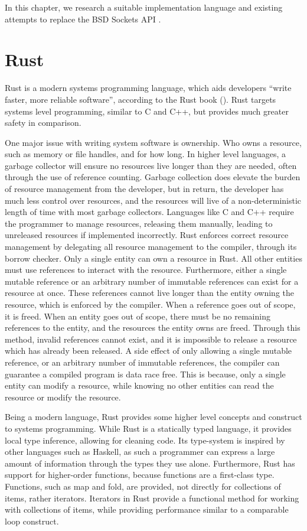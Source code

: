 In this chapter, we research a suitable implementation language and existing attempts to replace the BSD Sockets API .

\section{Rust}\label{sec:rust}
Rust is a modern systems programming language, which aids developers “write faster, more reliable software”, according
to the Rust book (\cite{kalbnik_rustprogramminglanguage_}).
Rust targets systems level programming, similar to C and C++, but provides much greater safety in comparison.

One major issue with writing system software is ownership.
Who owns a resource, such as memory or file handles, and for how long.
In higher level languages, a garbage collector will ensure no resources live longer than they are needed, often through
the use of reference counting.
Garbage collection does elevate the burden of resource management from the developer, but in return, the developer has
much less control over resources, and the resources will live of a non-deterministic length of time with most garbage
collectors.
Languages like C and C++ require the programmer to manage resources, releasing them manually, leading to unreleased
resources if implemented incorrectly.
Rust enforces correct resource management by delegating all resource management to the compiler, through its borrow
checker.
Only a single entity can own a resource in Rust.
All other entities must use references to interact with the resource.
Furthermore, either a single mutable reference or an arbitrary number of immutable references can exist for a resource
at once.
These references cannot live longer than the entity owning the resource, which is enforced by the compiler.
When a reference goes out of scope, it is freed.
When an entity goes out of scope, there must be no remaining references to the entity, and the resources the entity owns
are freed.
Through this method, invalid references cannot exist, and it is impossible to release a resource which has already been
released.
A side effect of only allowing a single mutable reference, or an arbitrary number of immutable references, the compiler
can guarantee a compiled program is data race free.
This is because, only a single entity can modify a resource, while knowing no other entities can read the resource or
modify the resource.

Being a modern language, Rust provides some higher level concepts and construct to systems programming.
While Rust is a statically typed language, it provides local type inference, allowing for cleaning code.
Its type-system is inspired by other languages such as Haskell, as such a programmer can express a large amount of
information through the types they use alone.
Furthermore, Rust has support for higher-order functions, because functions are a first-class type.
Functions, such as map and fold, are provided, not directly for collections of items, rather iterators.
Iterators in Rust provide a functional method for working with collections of items, while providing performance similar
to a comparable loop construct.

